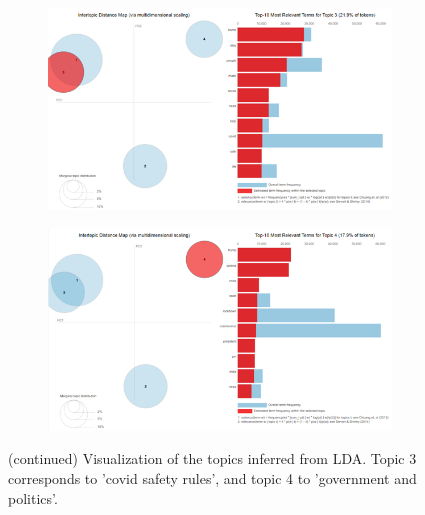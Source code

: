 \begin{figure}
 \ContinuedFloat
 \centering
 \begin{subfigure}{0.75\columnwidth}
 \includegraphics[width=1\textwidth]{images/lda3.png}
 \end{subfigure}
 \centering
 \begin{subfigure}{0.75\columnwidth}
 \includegraphics[width=1\textwidth]{images/lda4.png}
 \end{subfigure}
 \caption{(continued) Visualization of the topics inferred from LDA. Topic 3 corresponds to 'covid safety rules', and topic 4 to 'government and politics'.}
 \label{fig:lda_viz}
\end{figure}


